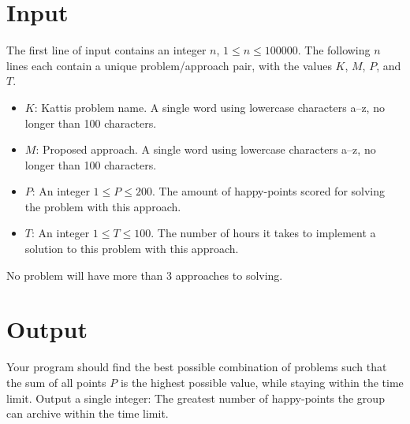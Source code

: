 \section*{Input}
The first line of input contains an integer $n$, $1\leq n\leq 100000$.
The following $n$ lines each contain a unique problem/approach pair, with the values $K$, $M$, $P$, and $T$. 
\begin{itemize}
    \item $K$: Kattis problem name. A single word using lowercase characters a–z, no longer than 100 characters.
    \item $M$: Proposed approach. A single word using lowercase characters a–z, no longer than 100 characters.
    \item $P$: An integer $1\leq P\leq 200$. The amount of happy-points scored for solving the problem with this approach.
    \item $T$: An integer $1\leq T\leq 100$. The number of hours it takes to implement a solution to this problem with this approach.
\end{itemize}
No problem will have more than 3 approaches to solving.

\section*{Output}
Your program should find the best possible combination of problems such that the sum of all points $P$ is the highest possible value, while staying within the time limit.
Output a single integer: The greatest number of happy-points the group can archive within the time limit.
